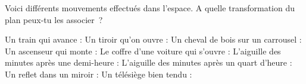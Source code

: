 %
%
Voici différents mouvements effectués dans l'espace. A quelle
    transformation du plan peux-tu les associer~?
    \begin{tasks}
        \task Un train qui avance : \dotfillbox[4cm]
        \task Un tiroir qu'on ouvre : \dotfillbox[4cm]
        \task Un cheval de bois sur un carrousel : \dotfillbox[4cm]
        \task Un ascenseur qui monte : \dotfillbox[4cm]
        \task Le coffre d'une voiture qui s'ouvre : \dotfillbox[4cm]
        \task L'aiguille des minutes après une demi-heure : \dotfillbox[4cm]
        \task L'aiguille des minutes après un quart d'heure : \dotfillbox[4cm]
        \task Un reflet dans un miroir : \dotfillbox[4cm]
        \task Un télésiège bien tendu : \dotfillbox[4cm]
    \end{tasks}
